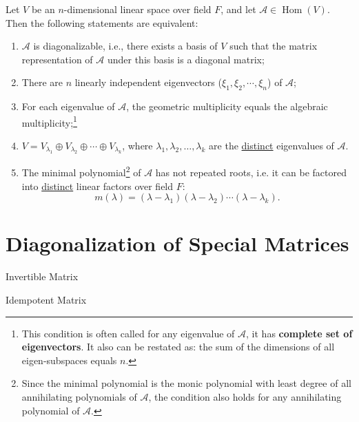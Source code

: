 \documentclass[11pt]{../../TexTemplate/elegantbook} %
\begin{document}
\begin{theorem}
    Let \( V \) be an \( n \)-dimensional linear space over field \( F \),
    and let \( \mathcal{A}\in \operatorname{Hom}(V) \).
    Then the following statements are equivalent:
    \begin{enumerate}
        \item \( \mathcal{A} \) is diagonalizable, i.e., there exists a basis of \( V \)
            such that the matrix representation of \( \mathcal{A} \) under this basis is a diagonal matrix;
        \item There are \( n \) linearly independent eigenvectors (\( \xi_{1}, \xi_{2}, \cdots, \xi_{n} \)) of \( \mathcal{A} \);
        \item For each eigenvalue of \( \mathcal{A} \), the geometric multiplicity equals the algebraic multiplicity;\footnote{
            This condition is often called for any eigenvalue of \( \mathcal{A} \), 
            it has \textbf{complete set of eigenvectors}.
            It also can be restated as: 
            the sum of the dimensions of all eigen-subspaces equals \( n \).
        }
        \item \( V = V_{\lambda_1} \oplus V_{\lambda_2} \oplus \cdots \oplus V_{\lambda_k} \),
            where \( \lambda_1, \lambda_2, \dots, \lambda_k \) are the \underline{distinct} eigenvalues of \( \mathcal{A} \).
        \item The minimal polynomial\footnote{
            Since the minimal polynomial is the monic polynomial with least degree 
            of all annihilating polynomials of \( \mathcal{A} \),
            the condition also holds for any annihilating polynomial of \( \mathcal{A} \).
        } of \( \mathcal{A} \) has not repeated roots, 
            i.e. it can be factored into \underline{distinct} linear factors over field \( F \):
            \[
            m(\lambda) = (\lambda - \lambda_1)(\lambda - \lambda_2) \cdots (\lambda - \lambda_k).
            \]
    \end{enumerate}
\end{theorem}

\section{Diagonalization of Special Matrices}
\begin{leftbarTitle}{Invertible Matrix}\end{leftbarTitle}

\begin{leftbarTitle}{Idempotent Matrix}\end{leftbarTitle}
\end{document}
